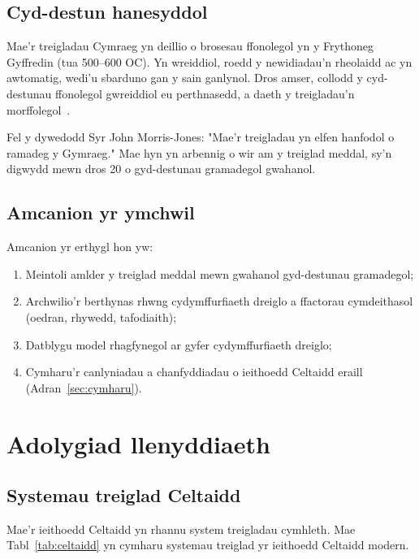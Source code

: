 \documentclass[12pt,a4paper]{article}
\begin{document}
\subsection{Cyd-destun hanesyddol}

Mae'r treigladau Cymraeg yn deillio o brosesau ffonolegol
yn y Frythoneg Gyffredin (tua 500--600 OC). Yn wreiddiol,
roedd y newidiadau'n rheolaidd ac yn awtomatig, wedi'u
sbarduno gan y sain ganlynol. Dros amser, collodd y
cyd-destunau ffonolegol gwreiddiol eu perthnasedd, a daeth
y treigladau'n morffolegol~\citep{russell1995}.

Fel y dywedodd Syr John Morris-Jones: "Mae'r treigladau yn
elfen hanfodol o ramadeg y Gymraeg." Mae hyn yn arbennig o
wir am y treiglad meddal, sy'n digwydd mewn dros 20 o
gyd-destunau gramadegol gwahanol.

\subsection{Amcanion yr ymchwil}

Amcanion yr erthygl hon yw:
\begin{enumerate}[label=(\roman*)]
  \item Meintoli amlder y treiglad meddal mewn gwahanol
        gyd-destunau gramadegol;
  \item Archwilio'r berthynas rhwng cydymffurfiaeth dreiglo
        a ffactorau cymdeithasol (oedran, rhywedd, tafodiaith);
  \item Datblygu model rhagfynegol ar gyfer cydymffurfiaeth dreiglo;
  \item Cymharu'r canlyniadau a chanfyddiadau o ieithoedd
        Celtaidd eraill (Adran~\ref{sec:cymharu}).
\end{enumerate}

\section{Adolygiad llenyddiaeth}
\label{sec:adolygiad}

\subsection{Systemau treiglad Celtaidd}

Mae'r ieithoedd Celtaidd yn rhannu system treigladau cymhleth.
Mae Tabl~\ref{tab:celtaidd} yn cymharu systemau treiglad yr
ieithoedd Celtaidd modern.
\end{document}
